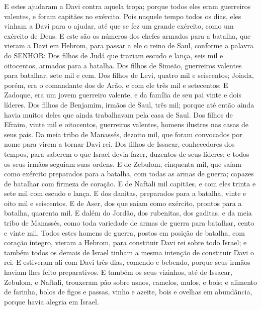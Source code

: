{  E estes ajudaram a Davi contra aquela tropa; porque todos eles eram guerreiros valentes, e foram capitães no exército.
  Pois naquele tempo todos os dias, eles vinham a Davi para o ajudar, até que se fez um grande exército, como um exército de Deus.
  E este são os números dos chefes armados para a batalha, que vieram a Davi em Hebrom, para passar a ele o reino de Saul, conforme a palavra do SENHOR:
  Dos filhos de Judá que traziam escudo e lança, seis mil e oitocentos, armados para a batalha.
  Dos filhos de Simeão, guerreiros valentes para batalhar, sete mil e cem.
  Dos filhos de Levi, quatro mil e seiscentos;
  Joiada, porém, era o comandante dos
{} de Arão, e com ele três mil e setecentos;
  E Zadoque, era um jovem guerreiro valente, e da família de seu pai vinte e dois líderes.
  Dos filhos de Benjamim, irmãos de Saul, três mil; porque até então ainda havia muitos deles que ainda trabalhavam pela casa de Saul.
  Dos filhos de Efraim, vinte mil e oitocentos, guerreiros valentes, homens ilustres nas casas de seus pais.
  Da meia tribo de Manassés, dezoito mil, que foram convocados por nome para virem a tornar Davi rei.
  Dos filhos de Issacar, conhecedores dos tempos, para saberem o que Israel devia fazer, duzentos de seus líderes; e todos os seus irmãos seguiam suas ordens.
  E de Zebulom, cinquenta mil, que saíam como exército preparados para a batalha, com todas as armas de guerra; capazes de batalhar com firmeza de coração.
  E de Naftali mil capitães, e com eles trinta e sete mil com escudo e lança.
  E dos danitas, preparados para a batalha, vinte e oito mil e seiscentos.
  E de Aser, dos que saíam como exército, prontos para a batalha, quarenta mil.
  E dalém do Jordão, dos rubenitas, dos gaditas, e da meia tribo de Manassés, como toda variedade de armas de guerra para batalhar, cento e vinte mil.
  Todos estes homens de guerra, postos em posição de batalha, com coração íntegro, vieram a Hebrom, para constituir Davi rei sobre todo Israel; e também todos os demais de Israel tinham a mesma intenção de constituir Davi o rei.
  E estiveram ali com Davi três dias, comendo e bebendo, porque seus irmãos haviam lhes feito preparativos.
  E também os seus vizinhos, até de Issacar, Zebulom, e Naftali, trouxeram pão sobre asnos, camelos, mulos, e bois; e alimento de farinha, bolos de figos e passas, vinho e azeite, bois e ovelhas em abundância, porque havia alegria em Israel.
\par }

